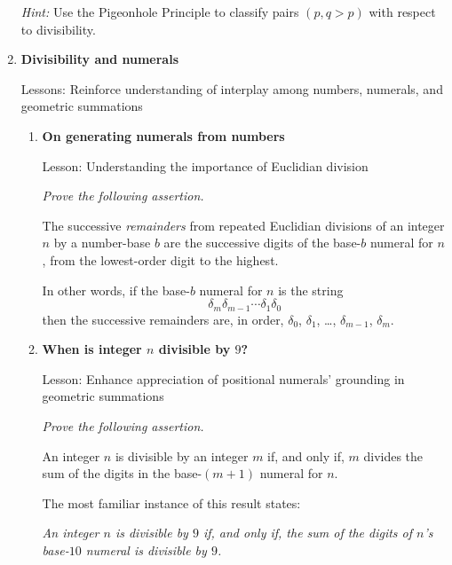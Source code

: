 \begin{enumerate}
\smallskip

\textit{Hint:}
Use the Pigeonhole Principle to classify pairs $(p, q > p)$ with respect to divisibility.

\medskip\item
{\bf Divisibility and numerals}

{\sc Lessons:} Reinforce understanding of interplay among numbers, numerals, and geometric summations

   \begin{enumerate}
   \item
{\bf On generating numerals from numbers}

{\sc Lesson:} Understanding the importance of Euclidian division

\smallskip

{\em Prove the following assertion.}

\begin{prop}
The successive {\em remainders} from repeated Euclidian divisions of an integer $n$ by a number-base $b$ are the successive digits of the base-$b$ numeral for $n$, from the lowest-order digit to the highest.
\end{prop}

\smallskip

In other words, if the base-$b$ numeral for $n$ is the string
\[ \delta_m \delta_{m-1}  \cdots \delta_1 \delta_0 \]
then the successive remainders are, in order, $\delta_0$, $\delta_1$, \ldots, $\delta_{m-1}$,
$\delta_m$.

   \medskip\item
{\bf When is integer $n$ divisible by $9$?}

{\sc Lesson:} Enhance appreciation of positional numerals' grounding in geometric summations

\smallskip

{\em Prove the following assertion.}

\begin{prop}
An integer $n$ is divisible by an integer $m$ if, and only if, $m$ divides the sum of the digits in the base-$(m+1)$ numeral for $n$.
\end{prop}

\smallskip

The most familiar instance of this result states:

{\it An integer $n$ is divisible by $9$ if, and only if, the sum of the digits of $n$'s base-$10$ numeral is divisible by $9$.}

\smallskip


\end{enumerate}
\end{enumerate}
